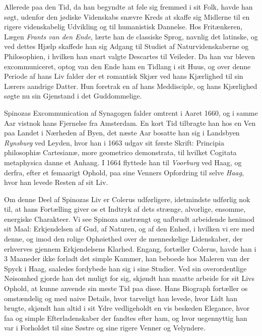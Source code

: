 \documentclass[12pt,a4paper]{book}
\newcommand{\opage}[1]{\marginnote{\footnotesize\textit{[#1]}}}
\begin{document}
Allerede paa den Tid, da han begyndte at føle sig fremmed i sit Folk,
havde han søgt, udenfor den jødiske Videnskabs snævre Kreds at skaffe sig
Midlerne til en rigere videnskabelig Udvikling og til humanistisk
Dannelse. Hos Fritænkeren, Lægen \emph{Frants van den Ende}, lærte han de
classiske Sprog, navnlig det latinske, og ved dettes Hjælp skaffede han
sig Adgang til Studiet af Naturvidenskaberne og Philosophien, i hvilken
han snart valgte Descartes til Veileder. Da han var bleven
excommuniceret, optog van den Ende ham en Tidlang i sit Huus, og over
denne Periode af hans Liv falder der et romantisk Skjær ved hans
Kjærlighed til sin Lærers aandrige Datter. Hun foretrak en af hans
Meddisciple, og hans Kjærlighed søgte nu sin Gjenstand i det
Guddommelige.

Spinozas Excommunication af Synagogen falder omtrent i Aaret 1660, og i
samme Aar vistnok hans Fjernelse fra Amsterdam. En kort Tid tilbragte han
hos en Ven paa Landet i Nærheden af Byen, det næste Aar bosatte han sig i
Landsbyen \emph{Rynsburg} ved Leyden, hvor han i 1663 udgav sit første
Skrift: Principia philosophiæ Cartesianæ, more geometrico demonstrata, til
hvilket Cogitata metaphysica danne et Anhang. I 1664 flyttede han til
\emph{Voorburg} ved Haag, og derfra, efter et femaarigt Ophold, paa sine
Venners Opfordring til selve \emph{Haag}, hvor han levede Resten af sit
Liv.

\opage{31} Om denne Deel af Spinozas Liv er Colerus udførligere, idetmindste
udførlig nok til, at hans Fortælling giver os et Indtryk af dets strænge,
alvorlige, ensomme, energiske Charakteer. Vi see Spinoza anstrængt og
uafbrudt arbeidende henimod sit Maal: Erkjendelsen af Gud, af Naturen, og
af den Enhed, i hvilken vi ere med denne, og imod den rolige Ophøiethed
over de menneskelige Lidenskaber, der erhverves gjennem Erkjendelsens
Klarhed. Engang, fortæller Colerus, havde han i 3 Maaneder ikke forladt
det simple Kammer, han beboede hos Maleren van der Spyck i Haag, saaledes
fordybede han sig i sine Studier. Ved sin overordentlige Nøisomhed gjorde
han det muligt for sig, skjøndt han maatte arbeide for sit Livs Ophold, at
kunne anvende sin meste Tid paa disse. Hans Biograph fortæller os
omstændelig og med naive Details, hvor tarveligt han levede, hvor Lidt han
brugte, skjøndt han altid i sit Ydre vedligeholdt en vis beskeden
Elegance, hvor faa og simple Efterladenskaber der fandtes efter ham, og
hvor uegennyttig han var i Forholdet til sine Søstre og sine rigere Venner
og Velyndere.
\end{document}
